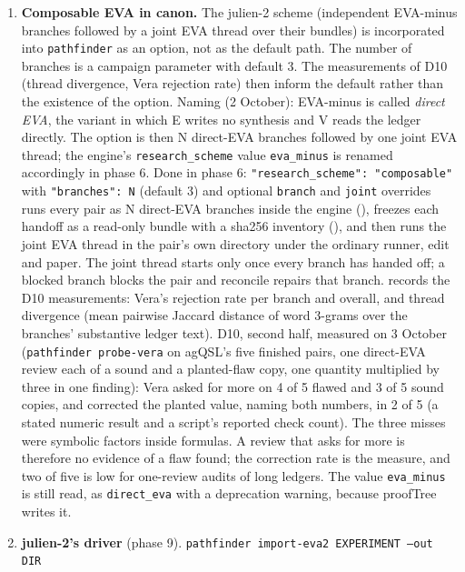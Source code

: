 \documentclass[11pt,a4paper]{article}
\begin{document}
\begin{enumerate}
  \texttt{repres} template as it stands, one file per iteration in
  .
\item \textbf{Composable EVA in canon.} The julien-2 scheme (independent
  EVA-minus branches followed by a joint EVA thread over their bundles) is
  incorporated into \texttt{pathfinder} as an option, not as the default path.
  The number of branches is a campaign parameter with default 3. The
  measurements of D10 (thread divergence, Vera rejection rate) then inform the
  default rather than the existence of the option.
  Naming (2 October): EVA-minus is called \emph{direct EVA}, the variant in
  which E writes no synthesis and V reads the ledger directly. The option is
  then N direct-EVA branches followed by one joint EVA thread; the engine's
  \texttt{research\_scheme} value \texttt{eva\_minus} is renamed accordingly in
  phase 6.
  Done in phase 6: \texttt{"research\_scheme": "composable"} with
  \texttt{"branches": N} (default 3) and optional \texttt{branch} and
  \texttt{joint} overrides runs every pair as N direct-EVA branches inside the
  engine (), freezes each handoff as a read-only
  bundle with a sha256 inventory (), and then
  runs the joint EVA thread in the pair's own directory under the ordinary
  runner, edit and paper. The joint thread starts only once every branch has
  handed off; a blocked branch blocks the pair and reconcile repairs that
  branch.  records the D10 measurements: Vera's
  rejection rate per branch and overall, and thread divergence (mean pairwise
  Jaccard distance of word 3-grams over the branches' substantive ledger text).
  D10, second half, measured on 3 October (\texttt{pathfinder probe-vera} on agQSL's five
  finished pairs, one direct-EVA review each of a sound and a planted-flaw copy, one quantity
  multiplied by three in one finding): Vera asked for more on 4 of 5 flawed and 3 of 5 sound
  copies, and corrected the planted value, naming both numbers, in 2 of 5 (a stated numeric
  result and a script's reported check count). The three misses were symbolic factors inside
  formulas. A review that asks for more is therefore no evidence of a flaw found; the
  correction rate is the measure, and two of five is low for one-review audits of long ledgers.
  The value \texttt{eva\_minus} is still read, as \texttt{direct\_eva} with a deprecation warning, because proofTree writes it.
\item \textbf{julien-2's driver} (phase 9). \texttt{pathfinder import-eva2 EXPERIMENT --out DIR}

\end{enumerate}
\end{document}
